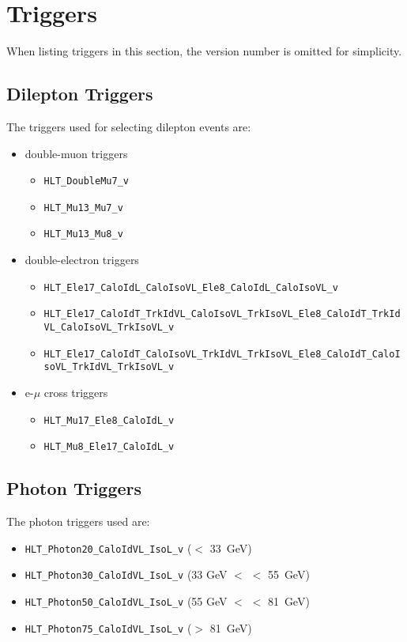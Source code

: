 \section{Triggers}

When listing triggers in this section, the version number is omitted for simplicity.

\subsection{Dilepton Triggers}
\label{app:trigsel}

The triggers used for selecting dilepton events are:

\begin{itemize}
\item double-muon triggers
  \begin{itemize}
  \item \verb=HLT_DoubleMu7_v=
  \item \verb=HLT_Mu13_Mu7_v=
  \item \verb=HLT_Mu13_Mu8_v=
  \end{itemize}
\item double-electron triggers
  \begin{itemize}
  \item \verb=HLT_Ele17_CaloIdL_CaloIsoVL_Ele8_CaloIdL_CaloIsoVL_v=
  \item \verb=HLT_Ele17_CaloIdT_TrkIdVL_CaloIsoVL_TrkIsoVL_Ele8_CaloIdT_TrkIdVL_CaloIsoVL_TrkIsoVL_v=
  \item \verb=HLT_Ele17_CaloIdT_CaloIsoVL_TrkIdVL_TrkIsoVL_Ele8_CaloIdT_CaloIsoVL_TrkIdVL_TrkIsoVL_v=
  \end{itemize}
\item e-$\mu$ cross triggers
  \begin{itemize}
  \item \verb=HLT_Mu17_Ele8_CaloIdL_v=
  \item \verb=HLT_Mu8_Ele17_CaloIdL_v=
  \end{itemize}
\end{itemize}


\subsection{Photon Triggers}
\label{app:photrig}

The photon triggers used are:

\begin{itemize}
\item \verb=HLT_Photon20_CaloIdVL_IsoL_v= (\Z \pt $<$ 33~GeV)
\item \verb=HLT_Photon30_CaloIdVL_IsoL_v= (33 GeV $<$ \Z \pt $<$ 55~GeV)
\item \verb=HLT_Photon50_CaloIdVL_IsoL_v= (55 GeV $<$ \Z \pt $<$ 81~GeV)
\item \verb=HLT_Photon75_CaloIdVL_IsoL_v= (\Z \pt $>$ 81~GeV)
\end{itemize}

